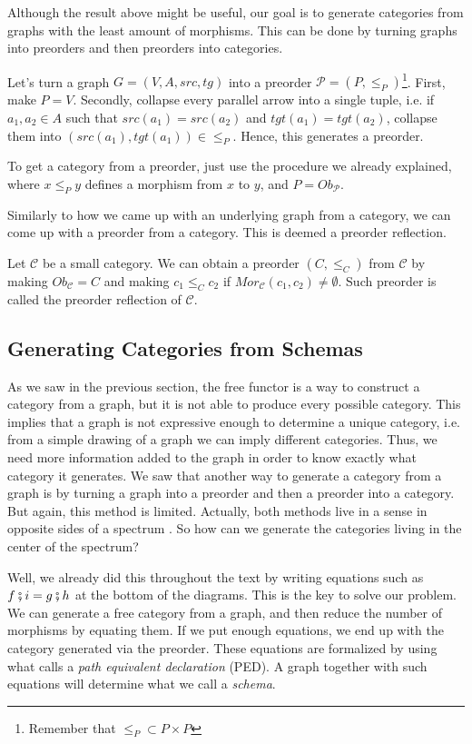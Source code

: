 Although the result above might be useful, our goal is to generate categories from graphs
with the least amount of morphisms. This can be done by turning graphs into preorders
and then preorders into categories.

Let's turn a graph $G = (V,A,src, tg)$ into a preorder $\mathcal P = (P, \leq_P)$\footnote{Remember that
$\leq_P \subset P \times P$}.
First, make $P = V$. Secondly, collapse every parallel arrow into a single tuple, i.e. if $a_1,a_2 \in A$
such that $src(a_1) = src(a_2)$ and $tgt(a_1) = tgt(a_2)$, collapse them into $(src(a_1), tgt(a_1)) \in \leq_P$.
Hence, this generates a preorder. 

To get a category from a preorder, just use the procedure we already explained, where $x \leq_P y$ defines
a morphism from $x$ to $y$, and $P = Ob_\mathcal P$.

Similarly to how we came up with an underlying graph from a category, we can come up with
a preorder from a category. This is deemed a preorder reflection.

\begin{definition}
  Let $\mathcal C$ be a small category. We can obtain a preorder $(C, \leq_C)$ from $\mathcal C$
  by making $Ob_\mathcal C = C$ and making $c_1 \leq_C c_2$ if $Mor_\mathcal C(c_1,c_2) \neq \emptyset$.
  Such preorder is called the preorder reflection of $\mathcal C$.
\end{definition}


\subsection{Generating Categories from Schemas}

As we saw in the previous section, the free functor is a way to construct a category
from a graph, but it is not able to produce every possible category. This implies
that a graph is not expressive enough to determine a unique category, i.e. from a simple
drawing of a graph we can imply different categories. Thus, we need more information
added to the graph in order to know exactly what category it generates.
We saw that another way to generate a category from a graph is by turning a graph into a preorder
and then a preorder into a category. But again, this method is limited.
Actually, both methods live in a sense in opposite sides of a spectrum \citep{fong2019invitation}.
So how can we generate the categories living in the center of the spectrum?

Well, we already
did this throughout the text by writing equations such as $f \fatsemi i = g \fatsemi h$
at the bottom of the diagrams. This is the key to solve our problem. We
can generate a free category from a graph, and then reduce the number of morphisms by
equating them. If we put enough equations, we end up with the category generated via 
the preorder.
These equations are formalized
by using what \citet{spivak2014category} calls a \textit{path equivalent declaration} (PED).
A graph together with such equations will determine what we call a \textit{schema}.

